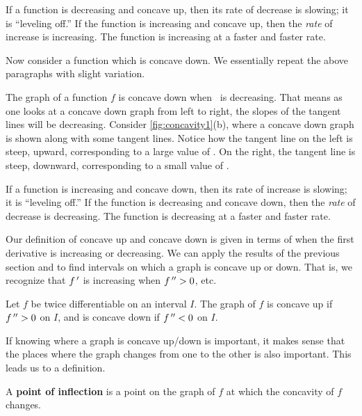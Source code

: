 If a function is decreasing and concave up, then its rate of decrease is slowing; it is ``leveling off.''  If the  function is increasing and concave up, then the \emph{rate} of increase is increasing.  The function is increasing at a faster and faster rate.

Now consider a function which is concave down. We essentially repeat the above paragraphs with slight variation.

The graph of a function $f$ is concave down  when \fp\ is decreasing. That means as one looks at a concave down graph from left to right, the slopes of the tangent lines will be decreasing. Consider \autoref{fig:concavity1}(b), where a concave down graph is shown along with some tangent lines. Notice how the tangent line on the left is  steep, upward, corresponding to a large value of \fp. On the right, the tangent line is steep, downward, corresponding to a small value of \fp.

If a function is increasing and concave down, then its rate of increase is slowing; it is ``leveling off.''  If the function is decreasing and concave down, then the \emph{rate} of decrease is decreasing.  The function is decreasing at a faster and faster rate.


Our definition of concave up and concave down is given in terms of when the first derivative is increasing or decreasing. We can apply the results of the previous section and to find intervals on which a graph is concave up or down. That is, we recognize that $f\,'$ is increasing when $f\,''>0$, etc. 

\begin{theorem}\label{thm:concavity}%
Let $f$ be twice differentiable on an interval $I$. The graph of $f$ is concave up if $f\,''>0$ on $I$, and is concave down if $f\,''<0$ on $I$. 
\end{theorem}

If knowing where a graph is concave up/down is important, it makes sense that the places where the graph changes from one to the other is also important. This leads us to a definition.

\begin{definition}\label{def:infl}%
A \textbf{point of inflection} is a point on the graph of $f$ at which the concavity of $f$ changes.
\end{definition}

